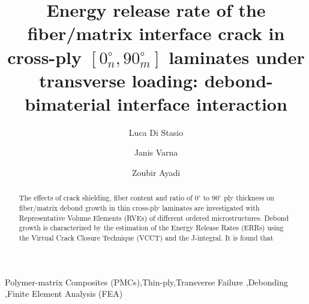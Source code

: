 \documentclass[review]{elsarticle}
\begin{document}
\begin{frontmatter}

\title{Energy release rate of the fiber/matrix interface crack in cross-ply $\left[0_{n}^{\circ},90_{m}^{\circ}\right]$ laminates under transverse loading: debond-bimaterial interface interaction}


\author[nancy,lulea]{Luca Di Stasio}
\author[lulea]{Janis Varna}
\author[nancy]{Zoubir Ayadi}


\address[nancy]{Universit\'e de Lorraine, EEIGM, IJL, 6 Rue Bastien Lepage, F-54010 Nancy, France}
\address[lulea]{Lule\aa\ University of Technology, University Campus, SE-97187 Lule\aa, Sweden}

\begin{abstract}
\noindent
The effects of crack shielding, fiber content and ratio of $0^{\circ}$ to $90^{\circ}$ ply thickness on fiber/matrix debond growth in thin cross-ply laminates are investigated with Representative Volume Elements (RVEs) of different ordered microstructures. Debond growth is characterized by the estimation of the Energy Release Rates (ERRs) using the Virtual Crack Closure Technique (VCCT) and the J-integral. It is found that 
\end{abstract}

\begin{keyword}
Polymer-matrix Composites (PMCs)\sep Thin-ply\sep Transverse Failure \sep Debonding \sep Finite Element Analysis (FEA)
\end{keyword}


\end{frontmatter}
\end{document}
